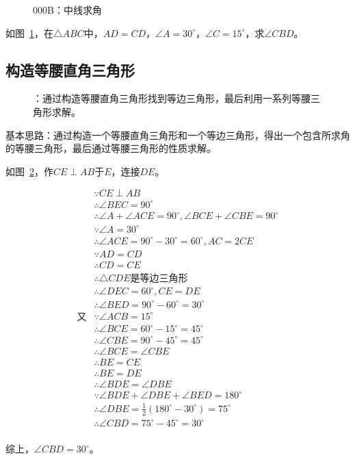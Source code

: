 

\begin{figure}[htbp]
  \centering
  \caption{000B：中线求角} \label{fig:000B}
\end{figure}

如图~\ref{fig:000B}，在$\triangle ABC$中，$AD = CD$，$\angle A = 30^\circ$，$\angle C = 15^\circ$，求$\angle CBD$。


\subsection{构造等腰直角三角形} \label{subsec:000B-isrtri}

\begin{figure}[htbp]
  \centering
  \caption{：通过构造等腰直角三角形找到等边三角形，最后利用一系列等腰三角形求解。}
  \label{fig:000B-isrtri}
\end{figure}

基本思路：通过构造一个等腰直角三角形和一个等边三角形，得出一个包含所求角的等腰三角形，最后通过等腰三角形的性质求解。

如图~\ref{fig:000B-isrtri}，作$CE \perp AB$于$E$，连接$DE$。

\begin{align*}
  &\because   CE \perp AB \\
  &\therefore \angle BEC = 90^\circ \\
  &\therefore \angle A + \angle ACE = 90^\circ, \angle BCE + \angle CBE = 90^\circ \\
  &\because   \angle A = 30^\circ \\
  &\therefore \angle ACE = 90^\circ - 30^\circ = 60^\circ, AC = 2CE \\
  &\because   AD = CD \\
  &\therefore CD = CE \\
  &\therefore \triangle CDE\text{是等边三角形} \\
  &\therefore \angle DEC = 60^\circ, CE = DE \\
  &\therefore \angle BED = 90^\circ - 60^\circ = 30^\circ \\
  \text{又}&\because \angle ACB = 15^\circ \\
  &\therefore \angle BCE = 60^\circ - 15^\circ = 45^\circ \\
  &\therefore \angle CBE = 90^\circ - 45^\circ = 45^\circ \\
  &\therefore \angle BCE = \angle CBE \\
  &\therefore BE = CE \\
  &\therefore BE = DE \\
  &\therefore \angle BDE = \angle DBE \\
  &\because   \angle BDE + \angle DBE + \angle BED = 180^\circ \\
  &\therefore \angle DBE = \frac12(180^\circ - 30^\circ) = 75^\circ \\
  &\therefore \angle CBD = 75^\circ - 45^\circ = 30^\circ \\
\end{align*}

综上，$\angle CBD = 30^\circ$。
